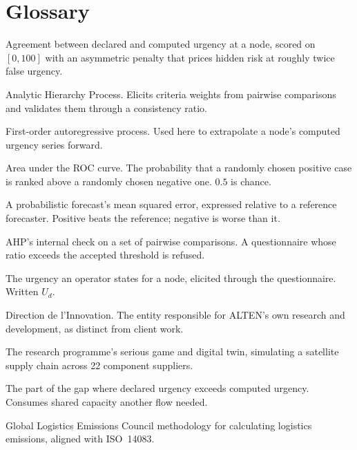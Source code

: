 \section*{Glossary}
\label{sec:glossaire}

\newcommand{\glosEntry}[2]{\item[#1] #2}

\begin{description}[leftmargin=3.9cm, style=nextline, labelwidth=3.6cm,
                    font=\bfseries\color{altenNavy}, itemsep=2pt]

\glosEntry{Adequacy score}{Agreement between declared and computed urgency at a node, scored
on $[0,100]$ with an asymmetric penalty that prices hidden risk at roughly twice false
urgency.}

\glosEntry{AHP}{Analytic Hierarchy Process. Elicits criteria weights from pairwise
comparisons and validates them through a consistency ratio.}

\glosEntry{AR(1)}{First-order autoregressive process. Used here to extrapolate a node's
computed urgency series forward.}

\glosEntry{AUC}{Area under the ROC curve. The probability that a randomly chosen positive
case is ranked above a randomly chosen negative one. $0.5$ is chance.}

\glosEntry{Brier skill}{A probabilistic forecast's mean squared error, expressed relative to
a reference forecaster. Positive beats the reference; negative is worse than it.}

\glosEntry{Consistency ratio}{AHP's internal check on a set of pairwise comparisons. A
questionnaire whose ratio exceeds the accepted threshold is refused.}

\glosEntry{Declared urgency}{The urgency an operator states for a node, elicited through the
questionnaire. Written $U_d$.}

\glosEntry{DIN}{Direction de l'Innovation. The entity responsible for ALTEN's own research
and development, as distinct from client work.}

\glosEntry{DISCO}{The research programme's serious game and digital twin, simulating a
satellite supply chain across 22 component suppliers.}

\glosEntry{False urgency}{The part of the gap where declared urgency exceeds computed
urgency. Consumes shared capacity another flow needed.}

\glosEntry{GLEC Framework}{Global Logistics Emissions Council methodology for calculating
logistics emissions, aligned with ISO~14083.}


\end{description}
